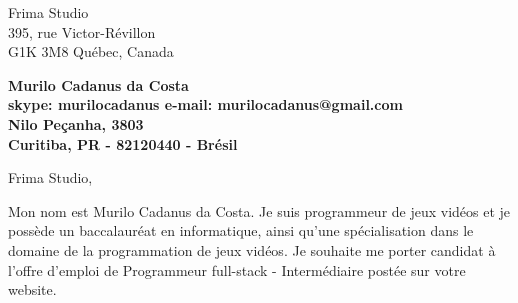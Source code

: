 \documentclass[11pt]{letter} %
\begin{document}

\begin{letter}{%
Frima Studio \\
395, rue Victor-Révillon \\
G1K 3M8 Québec, Canada}


\begin{center}
\large\bf Murilo Cadanus da Costa \\ %
skype: murilocadanus e-mail: murilocadanus@gmail.com \\
Nilo Peçanha, 3803 \\ Curitiba, PR - 82120440 - Brésil
\end{center}
\vfill

\signature{Murilo Cadanus da Costa} %


\opening{Frima Studio,}


Mon nom est Murilo Cadanus da Costa. Je suis programmeur de jeux vidéos et je possède un baccalauréat en informatique, ainsi qu'une spécialisation dans le domaine de la programmation de jeux vidéos. Je souhaite me porter candidat à l'offre d'emploi de Programmeur full-stack - Intermédiaire postée sur votre website.


\end{letter}
\end{document}
